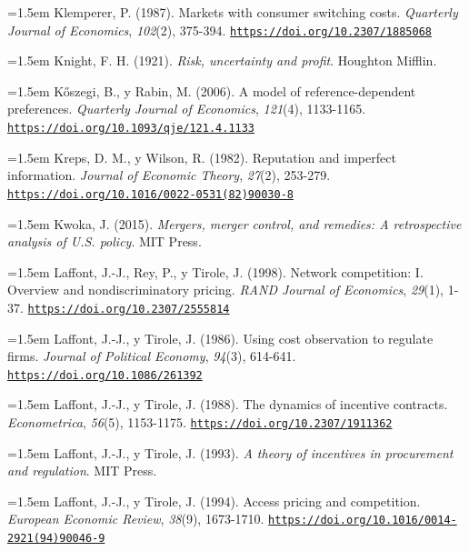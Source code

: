 \documentclass[10pt,a4paper]{article}
\begin{document}
\noindent\hangindent=1.5em Klemperer, P. (1987). Markets with consumer switching costs. \textit{Quarterly Journal of Economics}, \textit{102}(2), 375-394. \href{https://doi.org/10.2307/1885068}{\nolinkurl{https://doi.org/10.2307/1885068}}

\noindent\hangindent=1.5em Knight, F. H. (1921). \textit{Risk, uncertainty and profit}. Houghton Mifflin.

\noindent\hangindent=1.5em K\H{o}szegi, B., y Rabin, M. (2006). A model of reference-dependent preferences. \textit{Quarterly Journal of Economics}, \textit{121}(4), 1133-1165. \href{https://doi.org/10.1093/qje/121.4.1133}{\nolinkurl{https://doi.org/10.1093/qje/121.4.1133}}

\noindent\hangindent=1.5em Kreps, D. M., y Wilson, R. (1982). Reputation and imperfect information. \textit{Journal of Economic Theory}, \textit{27}(2), 253-279. \href{https://doi.org/10.1016/0022-0531(82)90030-8}{\nolinkurl{https://doi.org/10.1016/0022-0531(82)90030-8}}

\noindent\hangindent=1.5em Kwoka, J. (2015). \textit{Mergers, merger control, and remedies: A retrospective analysis of U.S. policy}. MIT Press.

\noindent\hangindent=1.5em Laffont, J.-J., Rey, P., y Tirole, J. (1998). Network competition: I. Overview and nondiscriminatory pricing. \textit{RAND Journal of Economics}, \textit{29}(1), 1-37. \href{https://doi.org/10.2307/2555814}{\nolinkurl{https://doi.org/10.2307/2555814}}

\noindent\hangindent=1.5em Laffont, J.-J., y Tirole, J. (1986). Using cost observation to regulate firms. \textit{Journal of Political Economy}, \textit{94}(3), 614-641. \href{https://doi.org/10.1086/261392}{\nolinkurl{https://doi.org/10.1086/261392}}

\noindent\hangindent=1.5em Laffont, J.-J., y Tirole, J. (1988). The dynamics of incentive contracts. \textit{Econometrica}, \textit{56}(5), 1153-1175. \href{https://doi.org/10.2307/1911362}{\nolinkurl{https://doi.org/10.2307/1911362}}

\noindent\hangindent=1.5em Laffont, J.-J., y Tirole, J. (1993). \textit{A theory of incentives in procurement and regulation}. MIT Press.

\noindent\hangindent=1.5em Laffont, J.-J., y Tirole, J. (1994). Access pricing and competition. \textit{European Economic Review}, \textit{38}(9), 1673-1710. \href{https://doi.org/10.1016/0014-2921(94)90046-9}{\nolinkurl{https://doi.org/10.1016/0014-2921(94)90046-9}}
\end{document}

